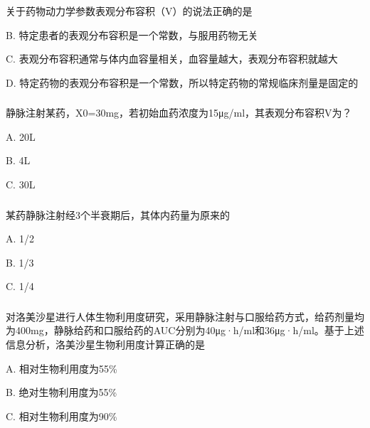 \documentclass[dvipsnames, svgnames, x11names]{beamer}
\begin{document}
\begin{frame}[t]
    \frametitle{}
    \begin{question}
        关于药物动力学参数表观分布容积（V）的说法正确的是
        \tcblower


        B. 特定患者的表观分布容积是一个常数，与服用药物无关

		C. 表观分布容积通常与体内血容量相关，血容量越大，表观分布容积就越大

		D. 特定药物的表观分布容积是一个常数，所以特定药物的常规临床剂量是固定的
        
    \end{question}
\end{frame}


\begin{frame}[t]
    \frametitle{}
    \begin{question}
        静脉注射某药，X0=30mg，若初始血药浓度为15μg/ml，其表观分布容积V为？
        \tcblower

        A. 20L

        B. 4L

		C. 30L

    \end{question}
\end{frame}


\begin{frame}[t]
    \frametitle{}
    \begin{question}
        某药静脉注射经3个半衰期后，其体内药量为原来的
        \tcblower

        A. 1/2

        B. 1/3

		C. 1/4

    \end{question}
\end{frame}


\begin{frame}[t]
    \frametitle{}
    \begin{question}
        对洛美沙星进行人体生物利用度研究，采用静脉注射与口服给药方式，给药剂量均为400mg，静脉给药和口服给药的AUC分别为40μg·h/ml和36μg·h/ml。基于上述信息分析，洛美沙星生物利用度计算正确的是
        \tcblower

        A. 相对生物利用度为55\%

        B. 绝对生物利用度为55\%

		C. 相对生物利用度为90\%

    \end{question}
\end{frame}
\end{document}
